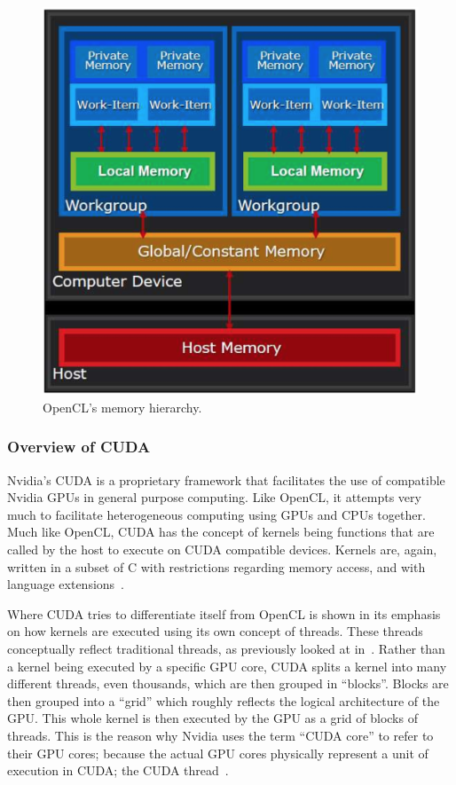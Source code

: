 \documentclass[a4paper,11pt]{article}
\begin{document}
\begin{figure}[ht]
  \centering
  \includegraphics[scale=0.5]{img/opencl-mem-model}
  \caption{OpenCL's memory hierarchy.~\cite{slides:KhronosOpenCLOverview}}
\label{fig:opencl-mem-model}
\end{figure}

\subsubsection{Overview of CUDA} %
\label{ssub:overview_of_cuda}
Nvidia's CUDA is a proprietary framework that facilitates the use of compatible Nvidia GPUs in general purpose computing.
Like OpenCL, it attempts very much to facilitate heterogeneous computing using GPUs and CPUs together. Much like OpenCL,
CUDA has the concept of kernels being functions that are called by the host to execute on CUDA compatible devices. Kernels
are, again, written in a subset of C with restrictions regarding memory access, and with language extensions~\cite{slides:KhronosOpenCLOverview}.

Where CUDA tries to differentiate itself from OpenCL is shown in its emphasis on how kernels are executed using its own
concept of threads. These threads conceptually reflect traditional threads, as previously looked at in~.
Rather than a kernel being executed by a specific GPU core, CUDA splits a kernel into many different threads, even thousands,
which are then grouped in ``blocks''. Blocks are then grouped into a ``grid'' which roughly reflects the logical architecture
of the GPU. This whole kernel is then executed by the GPU as a grid of blocks of threads. This is the reason why Nvidia
uses the term ``CUDA core'' to refer to their GPU cores; because the actual GPU cores physically represent a unit of
execution in CUDA; the CUDA thread~\cite{slides:KhronosOpenCLOverview}.
\end{document}
